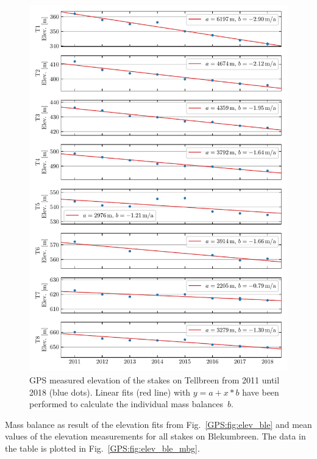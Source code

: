 \begin{figure}[H]
    \centering
    \includegraphics[width=\textwidth]{./figs/Elevation_Tellbreen.pdf}
    \caption{GPS measured elevation of the stakes on Tellbreen from 2011 until 2018 (blue dots).
    Linear fits (red line) with $y = a + x*b$ have been performed to calculate the individual mass balances~$b$.}
    \label{GPS:fig:elev_tel}
\end{figure}

\begin{table}[h]
	\caption{Mass balance as result of the elevation fits from Fig.~\ref{GPS:fig:elev_ble} and
	mean values of the elevation measurements for all stakes on Blekumbreen.
    The data in the table is plotted in Fig.~\ref{GPS:fig:elev_ble_mbg}.}
	\centering
	
	\label{GPS:tab:mbal_ble}
\end{table}

